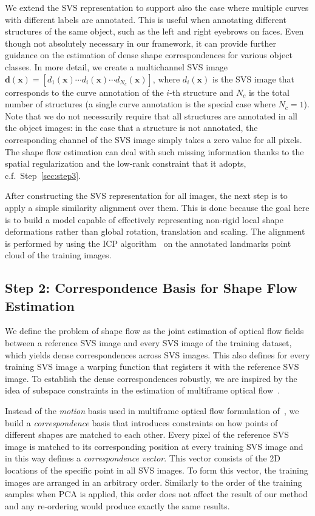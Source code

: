 We extend the SVS representation to support also the case where multiple curves with different labels are annotated. This is useful when annotating different structures of the same object, such as the left and right eyebrows on faces. Even though not absolutely necessary in our framework, it can provide further guidance on the estimation of dense shape correspondences for various object classes. In more detail, we create a multichannel SVS image $\bm{d}(\bm{x})=[d_1(\bm{x}) \cdots d_i(\bm{x}) \cdots d_{N_c}(\bm{x})]$, where $d_i(\bm{x})$ is the SVS image that corresponds to the curve annotation of the $i$-th structure and $N_c$ is the total number of structures (a single curve annotation is the special case where $N_c=1$). Note that we do not necessarily require that all structures are annotated in all the object images: in the case that a structure is not annotated, the corresponding channel of the SVS image simply takes a zero value for all pixels. The shape flow estimation can deal with such missing information thanks to the spatial regularization and the low-rank constraint that it adopts, c.f.~Step~\ref{sec:step3}.

After constructing the SVS representation for all images, the next step is to apply a simple similarity alignment over them. This is done because the goal here is to build a model capable of effectively representing non-rigid local shape deformations rather than global rotation, translation and scaling. The alignment is performed by using the ICP algorithm~\cite{Besl1992} on the annotated landmarks point cloud of the training images.


\subsection*{Step 2: Correspondence Basis for Shape Flow Estimation}
\label{sec:step2}

We define the problem of shape flow as the joint estimation of optical flow fields between a reference SVS image and every SVS image of the training dataset, which yields dense correspondences across SVS images. This also defines for every training SVS image a warping function that registers it with the reference SVS image. To establish the dense correspondences robustly, we are inspired by the idea of subspace constraints in the estimation of multiframe optical flow~\cite{Garg:2013hu,tomasi2012dense,snape15faceflow}.

Instead of the \emph{motion} basis used in multiframe optical flow formulation of~\cite{Garg:2013hu}, we build a \emph{correspondence} basis that introduces constraints on how points of different shapes are matched to each other. Every pixel of the reference SVS image is matched to its corresponding position at every training SVS image and in this way defines a \emph{correspondence vector}. This vector consists of the 2D locations of the specific point in all SVS images. To form this vector, the training images are arranged in an arbitrary order. Similarly to the order of the training samples when PCA is applied, this order does not affect the result of our method and any re-ordering would produce exactly the same results.


